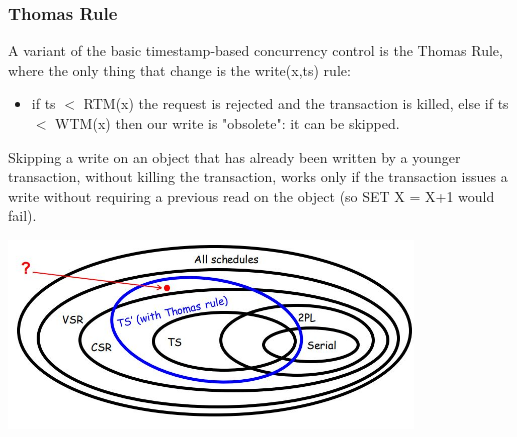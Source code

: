 \subsubsection{Thomas Rule}
A variant of the basic timestamp-based concurrency control is the Thomas Rule, where the only thing that change is the write(x,ts) rule:
\begin{itemize}
    \item if ts $<$ RTM(x) the request is rejected and the transaction is killed, else if ts $<$ WTM(x) then our write is "obsolete": it can be skipped.
\end{itemize}
Skipping a write on an object that has already been written
by a younger transaction, without killing the transaction, works only if the transaction issues a write without requiring a previous
read on the object (so SET X = X+1 would fail).
\begin{center}
    \includegraphics[height=5cm]{../arguments/thomasrule.JPG}
\end{center}
